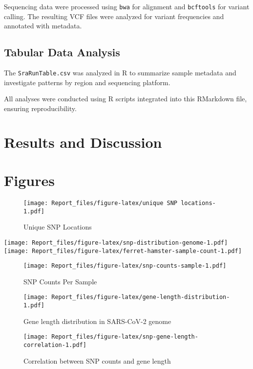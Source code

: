 \documentclass[
]{article}
\begin{document}
Sequencing data were processed using \texttt{bwa} for alignment and
\texttt{bcftools} for variant calling. The resulting VCF files were
analyzed for variant frequencies and annotated with metadata.

\hypertarget{tabular-data-analysis}{%
\subsection{Tabular Data Analysis}\label{tabular-data-analysis}}

The \texttt{SraRunTable.csv} was analyzed in R to summarize sample
metadata and investigate patterns by region and sequencing platform.

All analyses were conducted using R scripts integrated into this
RMarkdown file, ensuring reproducibility.

\hypertarget{results-and-discussion}{%
\section{Results and Discussion}\label{results-and-discussion}}

\hypertarget{figures}{%
\section{Figures}\label{figures}}

\begin{figure}
\centering
\texttt{[image: Report\_files/figure-latex/unique SNP locations-1.pdf]}
\caption{Unique SNP Locations}
\end{figure}

\texttt{[image: Report\_files/figure-latex/snp-distribution-genome-1.pdf]}
\texttt{[image: Report\_files/figure-latex/ferret-hamster-sample-count-1.pdf]}

\begin{figure}
\centering
\texttt{[image: Report\_files/figure-latex/snp-counts-sample-1.pdf]}
\caption{SNP Counts Per Sample}
\end{figure}

\begin{figure}
\centering
\texttt{[image: Report\_files/figure-latex/gene-length-distribution-1.pdf]}
\caption{Gene length distribution in SARS-CoV-2 genome}
\end{figure}

\begin{figure}
\centering
\texttt{[image: Report\_files/figure-latex/snp-gene-length-correlation-1.pdf]}
\caption{Correlation between SNP counts and gene length}
\end{figure}
\end{document}
